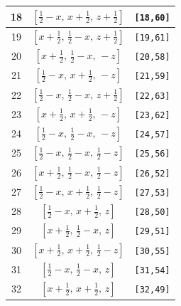 \documentclass[fleqn,8pt]{jsarticle}
\begin{document}
\begin{longtable}{ccc}
18 & $\left[ \frac{1}{2} - x,\, x + \frac{1}{2},\, z + \frac{1}{2} \right]$ & {\tt [18,60]} \\ \hline
19 & $\left[ x + \frac{1}{2},\, \frac{1}{2} - x,\, z + \frac{1}{2} \right]$ & {\tt [19,61]} \\ \hline
20 & $\left[ x + \frac{1}{2},\, \frac{1}{2} - x,\, - z \right]$ & {\tt [20,58]} \\ \hline
21 & $\left[ \frac{1}{2} - x,\, x + \frac{1}{2},\, - z \right]$ & {\tt [21,59]} \\ \hline
22 & $\left[ \frac{1}{2} - x,\, \frac{1}{2} - x,\, z + \frac{1}{2} \right]$ & {\tt [22,63]} \\ \hline
23 & $\left[ x + \frac{1}{2},\, x + \frac{1}{2},\, - z \right]$ & {\tt [23,62]} \\ \hline
24 & $\left[ \frac{1}{2} - x,\, \frac{1}{2} - x,\, - z \right]$ & {\tt [24,57]} \\ \hline
25 & $\left[ \frac{1}{2} - x,\, \frac{1}{2} - x,\, \frac{1}{2} - z \right]$ & {\tt [25,56]} \\ \hline
26 & $\left[ x + \frac{1}{2},\, \frac{1}{2} - x,\, \frac{1}{2} - z \right]$ & {\tt [26,52]} \\ \hline
27 & $\left[ \frac{1}{2} - x,\, x + \frac{1}{2},\, \frac{1}{2} - z \right]$ & {\tt [27,53]} \\ \hline
28 & $\left[ \frac{1}{2} - x,\, x + \frac{1}{2},\, z \right]$ & {\tt [28,50]} \\ \hline
29 & $\left[ x + \frac{1}{2},\, \frac{1}{2} - x,\, z \right]$ & {\tt [29,51]} \\ \hline
30 & $\left[ x + \frac{1}{2},\, x + \frac{1}{2},\, \frac{1}{2} - z \right]$ & {\tt [30,55]} \\ \hline
31 & $\left[ \frac{1}{2} - x,\, \frac{1}{2} - x,\, z \right]$ & {\tt [31,54]} \\ \hline
32 & $\left[ x + \frac{1}{2},\, x + \frac{1}{2},\, z \right]$ & {\tt [32,49]} \\
\end{longtable}
\renewcommand{\arraystretch}{1.2}
\end{document}
